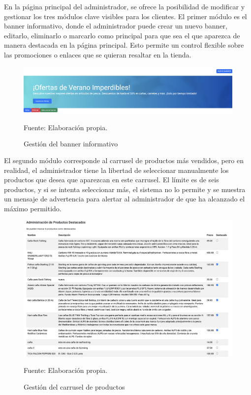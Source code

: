 En la página principal del administrador, se ofrece la posibilidad de modificar y gestionar los tres módulos clave visibles para los clientes. El primer módulo es el banner informativo, donde el administrador puede crear un nuevo banner, editarlo, eliminarlo o marcarlo como principal para que sea el que aparezca de manera destacada en la página principal. Esto permite un control flexible sobre las promociones o enlaces que se quieran resaltar en la tienda.

\begin{figure}[H]
\begin{center}
\includegraphics[scale=0.35]{./Images/vistaAdminBanner.png}
\caption{Gestión del banner informativo} Fuente: Elaboración propia.

\label{fig:fig1}

\end{center}
\end{figure}

El segundo módulo corresponde al carrusel de productos más vendidos, pero en realidad, el administrador tiene la libertad de seleccionar manualmente los productos que desea que aparezcan en este carrusel. El límite es de seis productos, y si se intenta seleccionar más, el sistema no lo permite y se muestra un mensaje de advertencia para alertar al administrador de que ha alcanzado el máximo permitido.

\begin{figure}[H]
\begin{center}
\includegraphics[scale=0.50]{./Images/vistaAdminCarrusel.png}
\caption{Gestión del carrusel de productos} Fuente: Elaboración propia.

\label{fig:fig1}

\end{center}
\end{figure}

